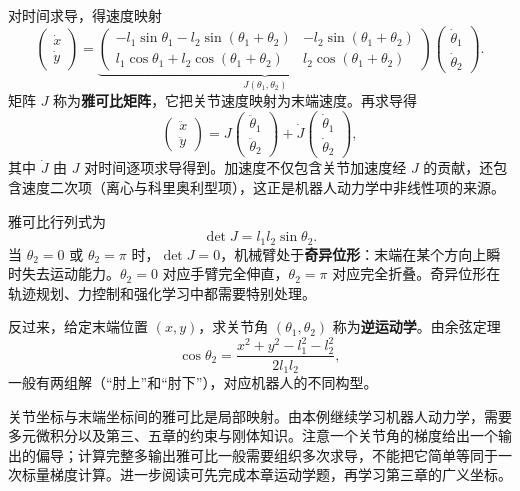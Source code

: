 \begin{example}
对时间求导，得速度映射
\begin{equation}
\begin{pmatrix}\dot x\\ \dot y\end{pmatrix}
=
\underbrace{
\begin{pmatrix}
-l_1\sin\theta_1-l_2\sin(\theta_1+\theta_2) & -l_2\sin(\theta_1+\theta_2)\\
l_1\cos\theta_1+l_2\cos(\theta_1+\theta_2) & l_2\cos(\theta_1+\theta_2)
\end{pmatrix}
}_{J(\theta_1,\theta_2)}
\begin{pmatrix}\dot\theta_1\\ \dot\theta_2\end{pmatrix}.
\label{eq:robot-jacobian}
\end{equation}
矩阵 $J$ 称为\textbf{雅可比矩阵}，它把关节速度映射为末端速度。再求导得
\begin{equation}
\begin{pmatrix}\ddot x\\ \ddot y\end{pmatrix}
=J\begin{pmatrix}\ddot\theta_1\\ \ddot\theta_2\end{pmatrix}
+\dot J\begin{pmatrix}\dot\theta_1\\ \dot\theta_2\end{pmatrix},
\label{eq:robot-acceleration}
\end{equation}
其中 $\dot J$ 由 $J$ 对时间逐项求导得到。加速度不仅包含关节加速度经 $J$ 的贡献，还包含速度二次项（离心与科里奥利型项），这正是机器人动力学中非线性项的来源。

雅可比行列式为
\begin{equation}
\det J=l_1l_2\sin\theta_2 .
\label{eq:robot-singularity}
\end{equation}
当 $\theta_2=0$ 或 $\theta_2=\pi$ 时，$\det J=0$，机械臂处于\textbf{奇异位形}：末端在某个方向上瞬时失去运动能力。$\theta_2=0$ 对应手臂完全伸直，$\theta_2=\pi$ 对应完全折叠。奇异位形在轨迹规划、力控制和强化学习中都需要特别处理。

反过来，给定末端位置 $(x,y)$，求关节角 $(\theta_1,\theta_2)$ 称为\textbf{逆运动学}。由余弦定理
\[
\cos\theta_2=\frac{x^2+y^2-l_1^2-l_2^2}{2l_1l_2},
\]
一般有两组解（“肘上”和“肘下”），对应机器人的不同构型。
\end{example}

\begin{modernbox}
关节坐标与末端坐标间的雅可比是局部映射。由本例继续学习机器人动力学，需要多元微积分以及第三、五章的约束与刚体知识。注意一个关节角的梯度给出一个输出的偏导；计算完整多输出雅可比一般需要组织多次求导，不能把它简单等同于一次标量梯度计算。进一步阅读可先完成本章运动学题，再学习第三章的广义坐标。
\end{modernbox}

